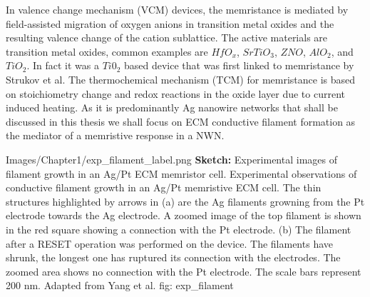 In valence change mechanism (VCM) devices, the memristance is mediated by field-assisted migration of oxygen anions in transition metal oxides and the resulting valence change of the cation sublattice\cite{waser2009}. The active materials are transition metal oxides, common examples are $HfO_x$, $SrTiO_3$, $ZNO$, $AlO_2$, and $TiO_2$\cite{gale2014,waser2007}. In fact it was a $Ti0_2$ based device that was first linked to memristance by Strukov et al\cite{strukov2008}. The thermochemical mechanism (TCM) for memristance is based on stoichiometry change and redox reactions in the oxide layer due to current induced heating\cite{ielmini2011}. As it is predominantly Ag nanowire networks that shall be discussed in this thesis we shall focus on ECM conductive filament formation as the mediator of a memristive response in a NWN\cite{scaling2018}.

{Images/Chapter1/exp_filament_label.png}
{\textbf{Sketch:} Experimental images of filament growth in an Ag/Pt ECM memristor cell.}
{Experimental observations of conductive filament growth in an Ag/Pt memristive ECM cell. The thin structures highlighted by arrows in (a) are the Ag filaments growning from the Pt electrode towards the Ag electrode. A zoomed image of the top filament is shown in the red square showing a connection with the Pt electrode. (b) The filament after a RESET operation was performed on the device. The filaments have shrunk, the longest one has ruptured its connection with the electrodes. The zoomed area shows no connection with the Pt electrode. The scale bars represent 200 nm. Adapted from Yang et al\cite{yang2012}.}
{fig: exp_filament}

